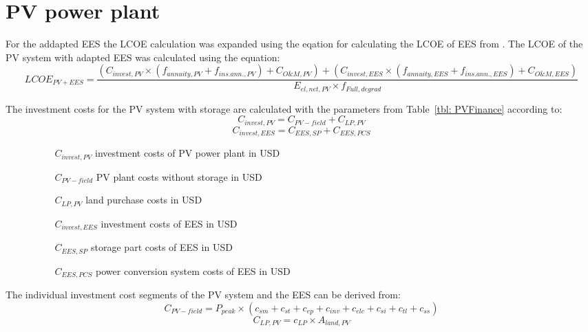 \section{PV power plant}
For the addapted EES the LCOE calculation was expanded using the eqation for calculating the LCOE of EES from \cite{Corcuera2015}. The LCOE of the PV system with adapted EES was calculated using the equation:  
\begin{equation}
LCOE_{PV+EES}=\frac{(C_{invest,PV}\times(f_{annuity,PV}+f_{ins.ann.,PV})+C_{O\&M,PV})+(C_{invest,EES}\times(f_{annuity,EES}+f_{ins.ann.,EES})+C_{O\&M,EES})}{E_{el,net,PV} \times f_{Full,degrad}}\label{eq:LCOE_PV}
\end{equation}

The investment costs for the PV system with storage are calculated with the parameters from Table~\ref{tbl: PVFinance} according to:
\begin{equation}
C_{invest,PV} = C_{PV-field}+C_{LP,PV}
\end{equation} 
\begin{equation}
C_{invest,EES} = C_{EES,SP}+C_{EES,PCS}
\end{equation} 
\begin{itemize}
\item[ ] 
\begin{itemize}
\item[ ] 
\begin{itemize}
\item[$C_{invest,PV}$]investment costs of PV power plant in USD
\item[$C_{PV-field}$]PV plant costs without storage in USD
\item[$C_{LP,PV}$]land purchase costs in USD
\item[$C_{invest,EES}$]investment costs of EES in USD
\item[$C_{EES,SP}$]storage part costs of EES in USD
\item[$C_{EES,PCS}$]power conversion system costs of EES in USD
\end{itemize}
\end{itemize}
\end{itemize}
The individual investment cost segments of the PV system and the  EES can be derived from:
\begin{equation}
C_{PV-field} = P_{peak} \times (c_{sm}+c_{st}+c_{ep}+c_{inv}+c_{elc}+c_{si}+c_{tl}+c_{ss})
\end{equation} 
\begin{equation}
C_{LP,PV} = c_{LP}\times A_{land,PV}
\end{equation} 
